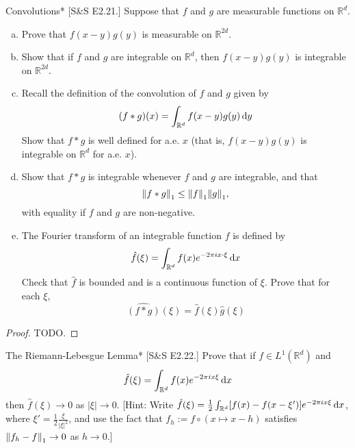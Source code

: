 \begin{problem}{Convolutions}*
    [S\&S E2.21.] Suppose that \( f \) and \( g \) are measurable functions on \( \mathbb{R}^d \).
    \begin{enumerate}[(a)]
        \itemsep0em
        \item Prove that \( f(x - y)g(y) \) is measurable on \( \mathbb{R}^{2d} \).
        \item Show that if \( f \) and \( g \) are integrable on \( \mathbb{R}^d \), then \( f(x - y)g(y) \) is integrable on \( \mathbb{R}^{2d} \).
        \item Recall the definition of the convolution of \( f \) and \( g \) given by
        \[
            (f * g)(x) = \int_{\mathbb{R}^d} f(x - y)g(y) \, \mathrm{d}y
        \]
        Show that \( f * g \) is well defined for a.e. \( x \) (that is, \( f(x - y)g(y) \) is integrable on \( \mathbb{R}^d \) for a.e. \( x \)).
        \item Show that \( f * g \) is integrable whenever \( f \) and \( g \) are integrable, and that
        \[
            \norm{f*g}_1 \leq \norm{f}_1 \norm{g}_1,
        \]
        with equality if \( f \) and \( g \) are non-negative.
        \item The Fourier transform of an integrable function \( f \) is defined by
        \[
            \hat{f}(\xi) = \int_{\mathbb{R}^d} f(x)e^{-2\pi i x \cdot \xi} \, \mathrm{d}x
        \]
        Check that \( \hat{f} \) is bounded and is a continuous function of \( \xi \). Prove that for each \( \xi \),
        \[
            \widehat{(f * g)}(\xi) = \hat{f}(\xi)\hat{g}(\xi)
        \]
    \end{enumerate}
\end{problem}

\begin{proof}
    TODO. 
\end{proof}


\begin{problem}{The Riemann-Lebesgue Lemma}*
    [S\&S E2.22.] Prove that if \(f \in L^1(\mathbb{R}^d)\) and 
    \[
        \hat{f}(\xi) = \int_{\mathbb{R}^d} f(x) e^{-2\pi i x \xi} \, \mathrm{d}x
    \]
    then \(\hat{f}(\xi) \to 0\) as \(|\xi| \to 0\). [Hint: Write \(\hat{f}(\xi) = \frac{1}{2} \int_{\mathbb{R}^d} [f(x) - f(x -\xi')] e^{-2\pi ix \xi} \, \mathrm{d}x\), where \(\xi' = \frac{1}{2} \frac{\xi}{|\xi|^2}\), and use the fact that \(f_h := f \circ (x \mapsto x -h)\) satisfies \(\norm{f_h - f}_1 \to 0\) as \(h \to 0\).]
\end{problem}

